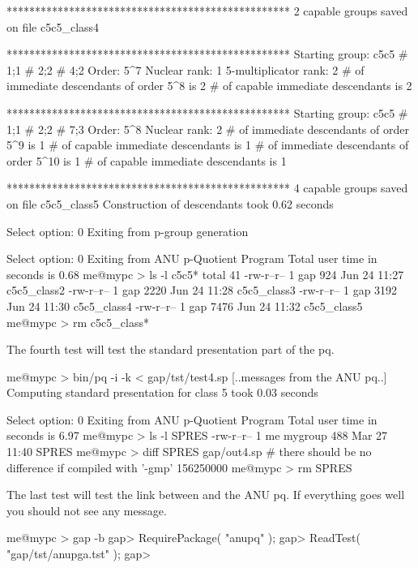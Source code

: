     **************************************************
    2 capable groups saved on file c5c5_class4

    **************************************************
    Starting group: c5c5 # 1;1 # 2;2 # 4;2
    Order: 5^7
    Nuclear rank: 1
    5-multiplicator rank: 2
    # of immediate descendants of order 5^8 is 2
    # of capable immediate descendants is 2

    **************************************************
    Starting group: c5c5 # 1;1 # 2;2 # 7;3
    Order: 5^8
    Nuclear rank: 2
    # of immediate descendants of order 5^9 is 1
    # of capable immediate descendants is 1
    # of immediate descendants of order 5^10 is 1
    # of capable immediate descendants is 1

    **************************************************
    4 capable groups saved on file c5c5_class5
    Construction of descendants took 0.62 seconds

    Select option: 0 
    Exiting from p-group generation

    Select option: 0 
    Exiting from ANU p-Quotient Program
    Total user time in seconds is 0.68
    me@mypc > ls -l c5c5*
    total 41
    -rw-r--r--    1 gap     924 Jun 24 11:27 c5c5_class2
    -rw-r--r--    1 gap    2220 Jun 24 11:28 c5c5_class3
    -rw-r--r--    1 gap    3192 Jun 24 11:30 c5c5_class4
    -rw-r--r--    1 gap    7476 Jun 24 11:32 c5c5_class5
    me@mypc > rm c5c5_class*
\endtt

The fourth test will test the standard presentation part of the pq.

\begintt
    me@mypc > bin/pq -i -k < gap/tst/test4.sp
    [..messages from the ANU pq..]
    Computing standard presentation for class 5 took 0.03 seconds

    Select option: 0 
    Exiting from ANU p-Quotient Program
    Total user time in seconds is 6.97
    me@mypc > ls -l SPRES
    -rw-r--r--    1 me   mygroup        488 Mar 27 11:40 SPRES
    me@mypc > diff SPRES gap/out4.sp
    # there should be no difference if compiled with '-gmp'
    156250000
    me@mypc > rm SPRES
\endtt

The last  test  will test the  link  between {\GAP} and   the ANU pq.  If
everything goes well you should not see any message.

\begintt
    me@mypc > gap -b
    gap> RequirePackage( "anupq" );
    gap> ReadTest( "gap/tst/anupga.tst" );
    gap>
\endtt


